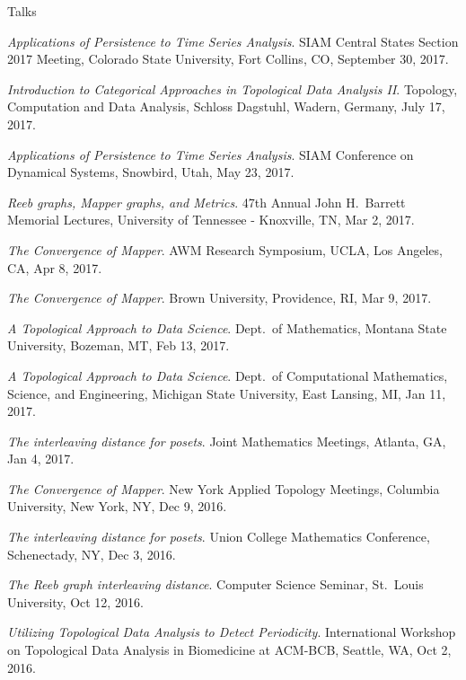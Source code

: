 \documentclass{resume} %
\begin{document}
\begin{rSection}{Talks}
\begin{etaremune}
\item\emph{Applications of Persistence to Time Series Analysis}. SIAM Central States Section 2017 Meeting, Colorado State University, Fort Collins, CO, September 30, 2017. 

\item\emph{Introduction to Categorical Approaches in Topological Data Analysis II}. Topology, Computation and Data Analysis, Schloss Dagstuhl, Wadern, Germany, July 17, 2017. 

\item\emph{Applications of Persistence to Time Series Analysis}. SIAM Conference on Dynamical Systems, Snowbird, Utah, May 23, 2017. 

\item\emph{Reeb graphs, Mapper graphs, and Metrics}. 47th Annual John H.~Barrett Memorial Lectures, University of Tennessee - Knoxville, TN, Mar 2, 2017. 

\item\emph{The Convergence of Mapper}. AWM Research Symposium, UCLA, Los Angeles, CA, Apr 8, 2017. 

\item\emph{The Convergence of Mapper}. Brown University, Providence, RI, Mar 9, 2017. 

\item\emph{A Topological Approach to Data Science}. Dept.~of Mathematics, Montana State University, Bozeman, MT, Feb 13, 2017. 

\item\emph{A Topological Approach to Data Science}. Dept.~of Computational Mathematics, Science, and Engineering, Michigan State University, East Lansing, MI, Jan 11, 2017. 

\item\emph{The interleaving distance for posets}. Joint Mathematics Meetings, Atlanta, GA, Jan 4, 2017. 

\item\emph{The Convergence of Mapper}. New York Applied Topology Meetings, Columbia University, New York, NY, Dec 9, 2016. 

\item\emph{The interleaving distance for posets}. Union College Mathematics Conference, Schenectady, NY, Dec 3, 2016. 

\item\emph{The Reeb graph interleaving distance}. Computer Science Seminar, St.~Louis University, Oct 12, 2016. 

\item\emph{Utilizing Topological Data Analysis to Detect Periodicity}. International Workshop on Topological Data Analysis in Biomedicine at ACM-BCB, Seattle, WA, Oct 2, 2016. 


\end{etaremune}
\end{rSection}
\end{document}
